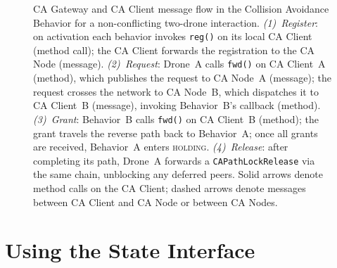\documentclass[deliverable]{csreport}
\renewcommand{\code}[1]{\texttt{\textcolor{CSMaroon}{#1}}}%
\begin{document}
\begin{figure}[tbh]
{{%
}}
\caption{CA Gateway and CA Client message flow in the Collision Avoidance Behavior for a non-conflicting two-drone interaction.
\textit{(1)~Register}: on activation each behavior invokes \texttt{reg()} on its local CA Client (method call); the CA Client forwards the registration to the CA Node (message).
\textit{(2)~Request}: Drone~A calls \texttt{fwd()} on CA Client~A (method), which publishes the request to CA Node~A (message); the request crosses the network to CA Node~B, which dispatches it to CA Client~B (message), invoking Behavior~B's callback (method).
\textit{(3)~Grant}: Behavior~B calls \texttt{fwd()} on CA Client~B (method); the grant travels the reverse path back to Behavior~A; once all grants are received, Behavior~A enters \textsc{holding}.
\textit{(4)~Release}: after completing its path, Drone~A forwards a \code{CAPathLockRelease} via the same chain, unblocking any deferred peers.
Solid arrows denote method calls on the CA Client; dashed arrows denote messages between CA Client and CA Node or between CA Nodes.}
\label{fig:ca_gateway_ca_beh}
\end{figure}

\section{Using the State Interface}
\end{document}
